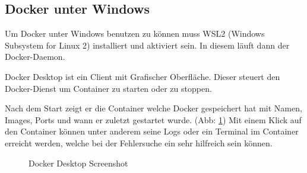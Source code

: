 \subsection{Docker unter Windows }
Um Docker unter Windows benutzen zu können muss WSL2 (Windows Subsystem for Linux 2) installiert und aktiviert sein.
In diesem läuft dann der Docker-Daemon.

Docker Desktop ist ein Client mit Grafischer Oberfläche. Dieser steuert den Docker-Dienst um Container zu starten oder zu stoppen.

Nach dem Start zeigt er die Container welche Docker gespeichert hat mit Namen, Images, Ports und wann er zuletzt gestartet wurde. (Abb: \ref{fig-docker-desktop})
Mit einem Klick auf den Container können unter anderem seine Logs oder ein Terminal im Container erreicht werden, welche bei der Fehlersuche ein sehr hilfreich sein können.
\cite{dockerDesktop}

\begin{figure}[htbp]
	\centering
	\caption{\label{fig-docker-desktop} Docker Desktop Screenshot}
\end{figure}

